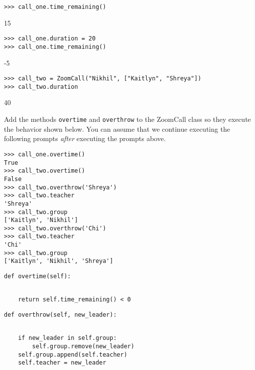 \begin{blocksection}
\begin{lstlisting}
>>> call_one.time_remaining()
\end{lstlisting}
\begin{solution}[.2in]
15
\end{solution}

\begin{lstlisting}
>>> call_one.duration = 20
>>> call_one.time_remaining()
\end{lstlisting}
\begin{solution}[.2in]
-5
\end{solution}

\begin{lstlisting}
>>> call_two = ZoomCall("Nikhil", ["Kaitlyn", "Shreya"])
>>> call_two.duration
\end{lstlisting}
\begin{solution}[.2in]
40
\end{solution}
\end{blocksection}

\question Add the methods \lstinline$overtime$ and \lstinline$overthrow$ to the ZoomCall class so they execute the behavior shown below. You can assume that we continue executing the following prompts \emph{after} executing the prompts above.

\begin{blocksection}
\begin{lstlisting}
>>> call_one.overtime()
True
>>> call_two.overtime()
False
>>> call_two.overthrow('Shreya')
>>> call_two.teacher
'Shreya'
>>> call_two.group
['Kaitlyn', 'Nikhil']
>>> call_two.overthrow('Chi')
>>> call_two.teacher
'Chi'
>>> call_two.group
['Kaitlyn', 'Nikhil', 'Shreya']
\end{lstlisting}
\end{blocksection}

\begin{lstlisting}
def overtime(self):
    
\end{lstlisting}

\begin{solution}[.5in]
\begin{lstlisting}
    return self.time_remaining() < 0
\end{lstlisting}
\end{solution}

\begin{lstlisting}
def overthrow(self, new_leader):
    
\end{lstlisting}

\begin{solution}[1.5in]
\begin{lstlisting}
    if new_leader in self.group:
        self.group.remove(new_leader)
    self.group.append(self.teacher)
    self.teacher = new_leader
\end{lstlisting}
\end{solution}